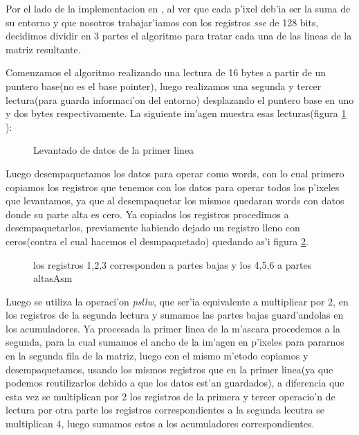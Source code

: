 Por el lado de la implementacion en \ass, al ver que cada p'ixel deb'ia ser la suma de su entorno y 
que nosotros trabajar'iamos con los registros \textit{sse} de 128 bits, decidimos 
dividir en 3 partes el algoritmo para tratar cada una de las lineas de la matriz resultante.

Comenzamos el algoritmo realizando una lectura de 16 bytes a partir de un puntero base(no es el base pointer), 
luego realizamos una segunda y tercer lectura(para guarda informaci'on del entorno)
desplazando el puntero base en uno y dos bytes respectivamente.
La siguiente im'agen muestra esas lecturas(figura \ref{est:s-dos} ):

\begin{figure}[h!]
\caption{Levantado de datos de la primer linea}
\label{est:s-dos}
\end{figure}

Luego desempaquetamos los datos para operar como words, con lo cual primero copiamos los registros que 
tenemos con los datos para operar todos los p'ixeles que levantamos, ya que al desempaquetar los mismos 
quedaran words con datos donde su parte alta es cero.
Ya copiados los registros procedimos a desempaquetarlos, previamente habiendo dejado un registro 
lleno con ceros(contra el cual hacemos el desmpaquetado) quedando as'i figura \ref{est:s-tres}.

\begin{figure}[h!]
\caption{los registros 1,2,3 corresponden a partes bajas y los 4,5,6 a partes altasAsm}
\label{est:s-tres}
\end{figure}
Luego se utiliza la operaci'on \textit{psllw}, que ser'ia equivalente a multiplicar por 2, en los 
registros de la segunda lectura y sumamos las partes bajas guard'andolas en los acumuladores.
Ya procesada la primer linea de la m'ascara procedemos a la segunda, para la cual sumamos el ancho de la 
im'agen en 
p'ixeles para pararnos en la segunda fila de la matriz, luego con el mismo m'etodo copiamos 
y desempaquetamos,  
usando los mismos registros que en la primer linea(ya que podemos reutilizarlos debido a que los datos est'an
guardados), a diferencia que esta vez se multiplican por 2 los 
registros de la primera y tercer operacio'n de lectura por otra parte los registros correspondientes a 
la segunda lecutra se multiplican 4, luego sumamos estos a los acumuladores correspondientes.

